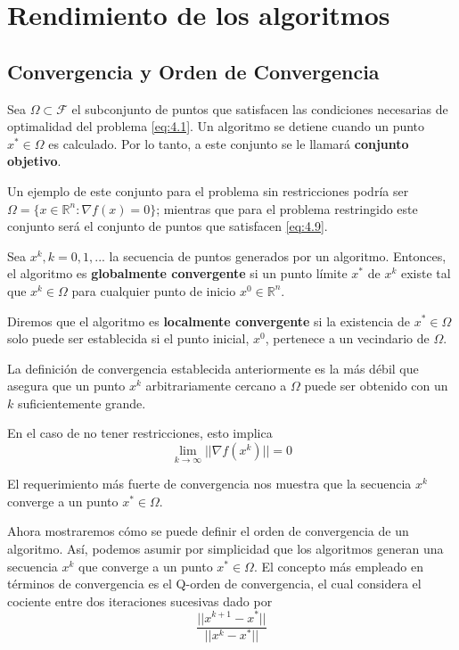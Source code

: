 \section{Rendimiento de los algoritmos}

\subsection{Convergencia y Orden de Convergencia}

\begin{definicion}
Sea $\Omega\subset\mathcal{F}$ el subconjunto de puntos que satisfacen las condiciones necesarias de optimalidad del problema \ref{eq:4.1}. 
Un algoritmo se detiene cuando un punto $x^*\in\Omega$ es calculado. 
Por lo tanto, a este conjunto se le llamará \textbf{conjunto objetivo}.
\end{definicion}

Un ejemplo de este conjunto para el problema sin restricciones podría ser $\Omega = \{x \in\mathbb{R}^n: \nabla f(x) = 0\}$; mientras que para el problema restringido este conjunto será el conjunto de puntos que satisfacen \ref{eq:4.9}.

\begin{definicion}
Sea $x^k, k=0,1,...$ la secuencia de puntos generados por un algoritmo. 
Entonces, el algoritmo es \textbf{globalmente convergente} si un punto límite $x^*$ de $x^k$ existe tal que $x^k\in\Omega$ para cualquier punto de inicio $x^0\in\mathbb{R}^n$.


Diremos que el algoritmo es \textbf{localmente convergente} si la existencia de $x^*\in\Omega$ solo puede ser establecida si el punto inicial, $x^0$, pertenece a un vecindario de $\Omega$.
\end{definicion}

La definición de convergencia establecida anteriormente es la más débil que asegura que un punto $x^k$ arbitrariamente cercano a $\Omega$ puede ser obtenido con un $k$ suficientemente grande.

En el caso de no tener restricciones, esto implica
\begin{equation*}
\lim_{k\xrightarrow{}{}\infty} ||\nabla f(x^k)|| = 0
\end{equation*}

El requerimiento más fuerte de convergencia nos muestra que la secuencia $x^k$ converge a un punto $x^*\in\Omega$.

Ahora mostraremos cómo se puede definir el orden de convergencia de un algoritmo. 
Así, podemos asumir por simplicidad que los algoritmos generan una secuencia $x^k$ que converge a un punto $x^*\in\Omega$. 
El concepto más empleado en términos de convergencia es el Q-orden de convergencia, el cual considera el cociente entre dos iteraciones sucesivas dado por
\begin{equation*}
\dfrac{||x^{k+1} - x^*||}{||x^k - x^*||}
\end{equation*}

